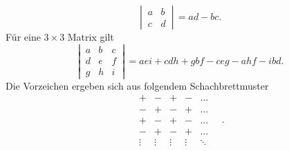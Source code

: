 \documentclass[a4paper,12pt]{article}
\begin{document}
\[ 
        \,\left|\, \begin{matrix}
                a&b\\c&d
        \end{matrix}\,\right|\, =ad-bc
.\] 
Für eine $3\times 3$ Matrix gilt
\[ 
        \,\left|\, \begin{matrix}
                a&b&c\\d&e&f\\g&h&i
        \end{matrix}\,\right|\, =aei+cdh+gbf-ceg-ahf-ibd
.\] 
Die Vorzeichen ergeben sich aus folgendem Schachbrettmuster
\[
        \begin{matrix}
                +&-&+&-&\hdots \\
                -&+&-&+&\hdots \\
                +&-&+&-&\hdots \\
                -&+&-&+&\hdots \\
                \vdots &\vdots &\vdots &\vdots &\ddots
        \end{matrix}
\quad.\]
\end{document}
